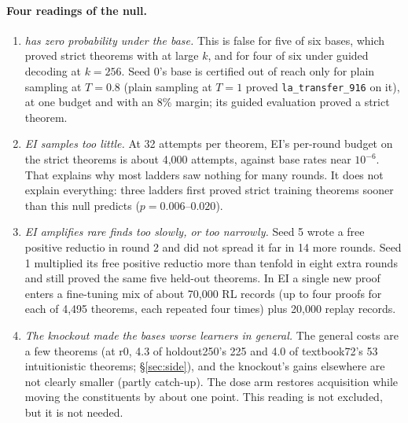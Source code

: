 \paragraph{Four readings of the null.}
\begin{enumerate}
\item \emph{\sig{} has zero probability under the base.} This is false for five of six bases, which proved strict theorems with
\sig{} at large $k$, and for four of six under guided decoding at $k = 256$. Seed 0's base is certified out of reach only
for plain sampling at $T = 0.8$ (plain sampling at $T = 1$ proved \texttt{la\_transfer\_916} on it), at one budget
and with an 8\% margin; its guided evaluation proved a strict theorem.
\item \emph{EI samples too little.} At 32 attempts per theorem, EI's per-round budget on the strict theorems is about
4,000 attempts, against base rates near $10^{-6}$. That explains why most ladders saw nothing for many rounds. It does
not explain everything: three ladders first proved strict training theorems sooner than this null predicts ($p = 0.006$--$0.020$).
\item \emph{EI amplifies rare finds too slowly, or too narrowly.} Seed 5 wrote a free positive reductio in round 2 and did
not spread it far in 14 more rounds. Seed 1 multiplied its free positive reductio more than tenfold in eight extra rounds and still
proved the same five held-out theorems. In EI a single new proof enters a fine-tuning mix of about 70,000 RL records (up
to four proofs for each of 4,495 theorems, each repeated four times) plus 20,000 replay records.
\item \emph{The knockout made the bases worse learners in general.} The general costs are a few theorems (at r0,
4.3 of holdout250's 225 and 4.0 of textbook72's 53 intuitionistic theorems; \S\ref{sec:side}), and the knockout's gains elsewhere are not clearly smaller (partly catch-up). The dose arm restores
acquisition while moving the constituents by about one point. This reading is not excluded, but it is not needed.
\end{enumerate}

